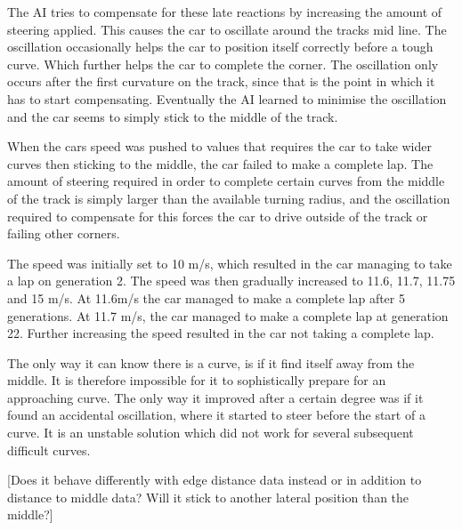 The AI tries to compensate for these late reactions by increasing the amount of steering applied. This causes the car to oscillate around the tracks mid line. The oscillation occasionally helps the car to position itself correctly before a tough curve. Which further helps the car to complete the corner. The oscillation only occurs after the first curvature on the track, since that is the point in which it has to start compensating. Eventually the AI learned to minimise the oscillation and the car seems to simply stick to the middle of the track.

When the cars speed was pushed to values that requires the car to take wider curves then sticking to the middle, the car failed to make a complete lap. The amount of steering required in order to complete certain curves from the middle of the track is simply larger than the available turning radius, and the oscillation required to compensate for this forces the car to drive outside of the track or failing other corners.

The speed was initially set to 10 m/s, which resulted in the car managing to take a lap on generation 2. The speed was then gradually increased to 11.6, 11.7, 11.75 and 15 m/s. At 11.6m/s the car managed to make a complete lap after 5 generations. At 11.7 m/s, the car managed to make a complete lap at generation 22. Further increasing the speed resulted in the car not taking a complete lap.


The only way it can know there is a curve, is if it find itself away from the middle. It is therefore impossible for it to sophistically prepare for an approaching curve. The only way it improved after a certain degree was if it found an accidental oscillation, where it started to steer before the start of a curve. It is an unstable solution which did not work for several subsequent difficult curves.

[Does it behave differently with edge distance data instead or in addition to distance to middle data? Will it stick to another lateral position than the middle?]



